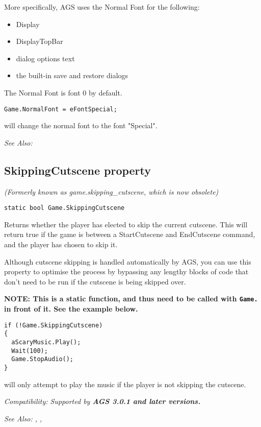 More specifically, AGS uses the Normal Font for the following:
\begin{itemize}
\item Display
\item DisplayTopBar
\item dialog options text
\item the built-in save and restore dialogs
\end{itemize}

The Normal Font is font 0 by default.

\begin{verbatim}
Game.NormalFont = eFontSpecial;
\end{verbatim}
will change the normal font to the font "Special".

\it{See Also:} 


\subsection{SkippingCutscene property}\label{Game.SkippingCutscene}%

\it{(Formerly known as game.skipping_cutscene, which is now obsolete)}

\begin{verbatim}
static bool Game.SkippingCutscene
\end{verbatim}
Returns whether the player has elected to skip the current cutscene. This will return true
if the game is between a StartCutscene and EndCutscene command, and the player has chosen to
skip it.

Although cutscene skipping is handled automatically by AGS, you can use this property to optimise
the process by bypassing any lengthy blocks of code that don't need to be run if the cutscene is
being skipped over.

\bf{NOTE:} This is a static function, and thus need to be called with \verb$Game.$ in front of it. See
the example below.

\begin{verbatim}
if (!Game.SkippingCutscene)
{
  aScaryMusic.Play();
  Wait(100);
  Game.StopAudio();
}
\end{verbatim}
will only attempt to play the music if the player is not skipping the cutscene.

\it{Compatibility:} Supported by \bf{AGS 3.0.1} and later versions.

\it{See Also:} , ,


